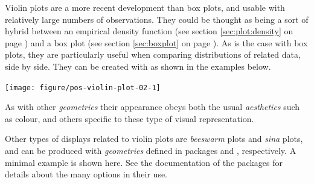 \documentclass[krantz2]{krantz}\usepackage{knitr}%
\begin{document}
Violin plots are a more recent development than box plots, and usable with relatively large numbers of observations. They could be thought as being a sort of hybrid between an empirical density function (see section \ref{sec:plot:density} on page \pageref{sec:plot:density}) and a box plot (see section \ref{sec:boxplot} on page \pageref{sec:boxplot}). As is the case with box plots, they are particularly useful when comparing distributions of related data, side by side. They can be created with   as shown in the examples below.

\begin{knitrout}\footnotesize
{}\color{fgcolor}\begin{kframe}
\begin{alltt}
  \hlopt{+}
  \hlstd{()}
\end{alltt}
\end{kframe}
\end{knitrout}

\begin{knitrout}\footnotesize
{}\color{fgcolor}\begin{kframe}
\begin{alltt}
    \hlopt{+}
  \hlstd{(} \hlstd{=} \hlstd{)} \hlopt{+}
  \hlstd{(} \hlstd{=} \hlstd{,}  \hlstd{=} \hlstd{,}
              \hlstd{=} \hlstd{,}  \hlstd{=} \hlstd{)}
\end{alltt}
\end{kframe}

{\centering \texttt{[image: figure/pos-violin-plot-02-1]} 

}



\end{knitrout}

As with other \emph{geometries} their appearance obeys both the usual \emph{aesthetics} such as colour, and others specific to these type of visual representation.

Other types of displays related to violin plots are \emph{beeswarm} plots and \emph{sina} plots, and can be produced with \emph{geometries} defined in packages  and , respectively. A minimal example is shown here. See the documentation of the packages for details about the many options in their use.
\end{document}
